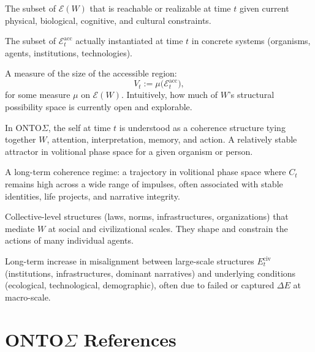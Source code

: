 \documentclass[12pt,a4paper]{report}
\newcommand{\Will}{W}
\begin{document}
\begin{description}[leftmargin=2.5cm,style=nextline]
    \item[\(\mathcal{E}_t^{\mathrm{acc}}\) (Accessible structure region)] 
    The subset of \(\mathcal{E}(\Will)\) that is reachable or realizable at time \(t\) given current physical, biological, cognitive, and cultural constraints.

    \item[\(\mathcal{E}_t^{\mathrm{real}}\) (Realized structures)] 
    The subset of \(\mathcal{E}_t^{\mathrm{acc}}\) actually instantiated at time \(t\) in concrete systems (organisms, agents, institutions, technologies).

    \item[\textbf{Volume of will} (\(V_t\))] 
    A measure of the size of the accessible region:
    \[
        V_t := \mu\bigl(\mathcal{E}_t^{\mathrm{acc}}\bigr),
    \]
    for some measure \(\mu\) on \(\mathcal{E}(\Will)\). Intuitively, how much of \(\Will\)'s structural possibility space is currently open and explorable.

    \item[\textbf{Self (Self\(_t\))}] 
    In ONTO$\Sigma$, the self at time \(t\) is understood as a coherence structure tying together \(\Will\), attention, interpretation, memory, and action. A relatively stable attractor in volitional phase space for a given organism or person.

    \item[\textbf{Meaning (long-term coherence)}] 
    A long-term coherence regime: a trajectory in volitional phase space where \(C_t\) remains high across a wide range of impulses, often associated with stable identities, life projects, and narrative integrity.

    \item[\textbf{Institutional structure} (\(E_t^{\mathrm{macro}}\))] 
    Collective-level structures (laws, norms, infrastructures, organizations) that mediate \(\Will\) at social and civilizational scales. They shape and constrain the actions of many individual agents.

    \item[\textbf{Civilizational drift}] 
    Long-term increase in misalignment between large-scale structures \(E_t^{\mathrm{civ}}\) (institutions, infrastructures, dominant narratives) and underlying conditions (ecological, technological, demographic), often due to failed or captured $\Delta E$ at macro-scale.

\end{description}


\chapter{ONTO$\Sigma$ References}
\label{appendix:ontos-references}
\end{document}

